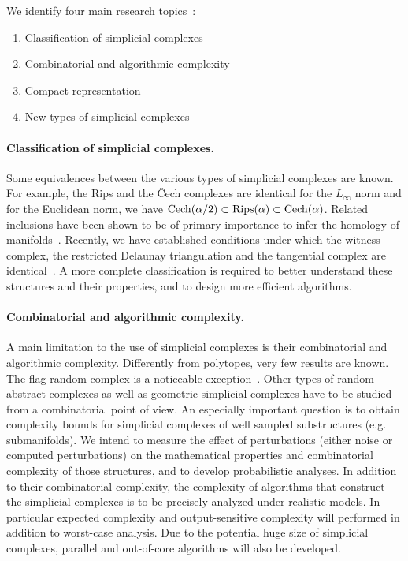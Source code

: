 We identify four main research topics~:
\begin{enumerate}
\item Classification of simplicial complexes
\item Combinatorial and algorithmic complexity 
\item Compact representation
\item New types of simplicial complexes
\end{enumerate}

\paragraph{Classification of  simplicial complexes.}
Some equivalences between the various types of simplicial complexes are known. For example,
the Rips and the \v{C}ech complexes are identical for the $L_{\infty}$ norm and for the Euclidean norm, we have $ {\rm {C}ech} ({\alpha}/{2}) \subset {\rm Rips} (\alpha) \subset {\rm {C}ech} (\alpha)$. Related inclusions %
have been shown to be of primary importance to infer the homology of manifolds~\cite{co-tpr-2008}.
Recently, we have established conditions under which the witness complex, the restricted Delaunay triangulation and the tangential complex are identical~\cite{boissonnat2012stab}. A more complete classification is required to better understand these structures and their properties, and to design
more efficient algorithms.




\paragraph{Combinatorial and algorithmic complexity.}
A main limitation to the use of simplicial complexes is their combinatorial and algorithmic complexity.  Differently from polytopes, very few results are known. The flag random complex is a noticeable exception~\cite{CambridgeJournals:2077252}. Other types of random abstract complexes as well as geometric simplicial complexes have to be studied from a combinatorial point of view. An especially important question is to obtain complexity bounds for simplicial complexes of well sampled substructures (e.g. submanifolds).  We intend to measure the effect of perturbations (either noise or computed perturbations) on the mathematical properties and combinatorial complexity of those structures, and to develop probabilistic analyses. In addition to their combinatorial complexity, the complexity of algorithms that construct the simplicial complexes is to be precisely analyzed under realistic models. In particular expected complexity and output-sensitive complexity will performed in addition to worst-case analysis. Due to the potential huge size of simplicial complexes, parallel and out-of-core algorithms will also be developed.


